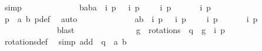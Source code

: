 \begin{isabellebody}
\ simp\isanewline
\ \ \ \ \ \ \ \ \ \ \isamarkupfalse%
\ \isamarkupfalse%
\ {\isachardoublequoteopen}{\isacharbraceleft}{\isacharparenleft}b{}{\isacharcomma}a{}{\isacharparenright}{\isacharcomma}{\isacharparenleft}{\isacharminus}b{}{\isacharcomma}{\isacharminus}a{}{\isacharparenright}{\isacharbraceright}\ {\isasymsubseteq}\ {\isacharbraceleft}i\ p{\isacharcomma}\ {\isacharparenleft}{\isasymrho}\ {\isasymcirc}\ i{\isacharparenright}\ p{\isacharcomma}\ {\isacharparenleft}{\isasymrho}\ {\isasymcirc}\ {\isasymrho}\ {\isasymcirc}\ i{\isacharparenright}\ p{\isacharcomma}\ {\isacharparenleft}{\isasymrho}\ {\isasymcirc}\ {\isasymrho}\ {\isasymcirc}\ {\isasymrho}\ {\isasymcirc}\ i{\isacharparenright}\ p{\isacharbraceright}{\isachardoublequoteclose}\isanewline
\ \ \ \ \ \ \ \ \ \ \ \ \isamarkupfalse%
\ {\isacartoucheopen}p\ {\isacharequal}\ {\isacharparenleft}a{}{\isacharcomma}\ b{}{\isacharparenright}{\isacartoucheclose}\ p{\isacharunderscore}def\ \isamarkupfalse%
\ auto\isanewline
\ \ \ \ \ \ \ \ \ \ \isamarkupfalse%
\ \isamarkupfalse%
\ {\isachardoublequoteopen}{\isacharparenleft}a{}{\isacharcomma}b{}{\isacharparenright}\ {\isasymin}\ {\isacharbraceleft}i\ p{\isacharcomma}\ {\isacharparenleft}{\isasymrho}\ {\isasymcirc}\ i{\isacharparenright}\ p{\isacharcomma}\ {\isacharparenleft}{\isasymrho}\ {\isasymcirc}\ {\isasymrho}\ {\isasymcirc}\ i{\isacharparenright}\ p{\isacharcomma}\ {\isacharparenleft}{\isasymrho}\ {\isasymcirc}\ {\isasymrho}\ {\isasymcirc}\ {\isasymrho}\ {\isasymcirc}\ i{\isacharparenright}\ p{\isacharbraceright}{\isachardoublequoteclose}\isanewline
\ \ \ \ \ \ \ \ \ \ \ \ \isamarkupfalse%
\ blast\isanewline
\ \ \ \ \ \ \ \ \ \ \isamarkupfalse%
\ \isamarkupfalse%
\ {\isachardoublequoteopen}{\isacharparenleft}{\isasymexists}\ g\ {\isasymin}\ rotations{\isachardot}\ {\isasymtau}\ q\ {\isacharequal}\ {\isacharparenleft}g\ {\isasymcirc}\ i{\isacharparenright}\ p{\isacharparenright}{\isachardoublequoteclose}\isanewline
\ \ \ \ \ \ \ \ \ \ \ \ \isamarkupfalse%
\ rotations{\isacharunderscore}def\ \isamarkupfalse%
\ {\isacharparenleft}simp\ add{\isacharcolon}\ {\isacartoucheopen}{\isasymtau}\ q\ {\isacharequal}\ {\isacharparenleft}a{}{\isacharcomma}\ b{}{\isacharparenright}{\isacartoucheclose}{\isacharparenright}\isanewline
\ \ \ \ \ \ \ \ \ \ \isamarkupfalse%

\end{isabellebody}
